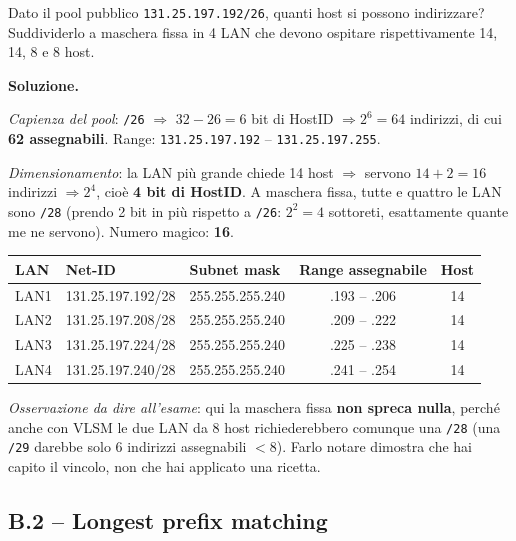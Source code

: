 \documentclass[12pt, a4paper]{article}
\begin{document}
\begin{tcolorbox}[colback=orange!5, colframe=orange!70!black, title=\textbf{Esercizio B.1 (chiesto all'orale)}]
Dato il pool pubblico \texttt{131.25.197.192/26}, quanti host si possono indirizzare? Suddividerlo a maschera fissa in 4 LAN che devono ospitare rispettivamente 14, 14, 8 e 8 host.

\textbf{Soluzione.}

\textit{Capienza del pool}: \texttt{/26} $\Rightarrow$ $32-26 = 6$ bit di HostID $\Rightarrow 2^6 = 64$ indirizzi, di cui \textbf{62 assegnabili}. Range: \texttt{131.25.197.192} -- \texttt{131.25.197.255}.

\textit{Dimensionamento}: la LAN più grande chiede 14 host $\Rightarrow$ servono $14+2=16$ indirizzi $\Rightarrow 2^4$, cioè \textbf{4 bit di HostID}. A maschera fissa, tutte e quattro le LAN sono \texttt{/28} (prendo 2 bit in più rispetto a \texttt{/26}: $2^2 = 4$ sottoreti, esattamente quante me ne servono). Numero magico: \textbf{16}.

\begin{center}
\small
\begin{tabular}{lllcc}
\toprule
\textbf{LAN} & \textbf{Net-ID} & \textbf{Subnet mask} & \textbf{Range assegnabile} & \textbf{Host} \\
\midrule
LAN1 & 131.25.197.192/28 & 255.255.255.240 & .193 -- .206 & 14 \\
LAN2 & 131.25.197.208/28 & 255.255.255.240 & .209 -- .222 & 14 \\
LAN3 & 131.25.197.224/28 & 255.255.255.240 & .225 -- .238 & 14 \\
LAN4 & 131.25.197.240/28 & 255.255.255.240 & .241 -- .254 & 14 \\
\bottomrule
\end{tabular}
\end{center}

\textit{Osservazione da dire all'esame}: qui la maschera fissa \textbf{non spreca nulla}, perché anche con VLSM le due LAN da 8 host richiederebbero comunque una \texttt{/28} (una \texttt{/29} darebbe solo 6 indirizzi assegnabili $< 8$). Farlo notare dimostra che hai capito il vincolo, non che hai applicato una ricetta.
\end{tcolorbox}

\subsection*{B.2 -- Longest prefix matching}
\end{document}
